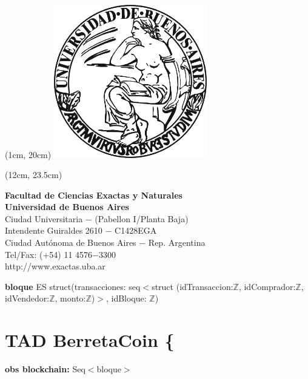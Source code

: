 \documentclass{article}
\newcommand{\Entero}{$\mathds{Z}$}
\begin{document}
\begin{textblock*}{17cm} (1cm, 20cm)
    {
    \includegraphics[width=0.5\textwidth]{uba_logo.jpg}
    }
\end{textblock*}

\begin{textblock*}{20cm} (12cm, 23.5cm)
    {\raggedright\textbf{Facultad de Ciencias Exactas y Naturales}\\
    \textbf{Universidad de Buenos Aires}\\
    Ciudad Universitaria $-$ (Pabellon I/Planta Baja)\\
    Intendente Guiraldes 2610 $-$ C1428EGA\\
    Ciudad Autónoma de Buenos Aires $-$ Rep. Argentina\\
    Tel/Fax: (+54) 11 4576$-$3300\\
    http://www.exactas.uba.ar
    }
\end{textblock*}



\newpage
\setcounter{page}{1}

\begin{flushleft}
    {\selectfont\textbf{bloque} ES} struct(transacciones: seq$<$struct (idTransaccion:\Entero, idComprador:\Entero, idVendedor:\Entero, monto:\Entero)$>$, idBloque: \Entero)
\end{flushleft}

\section*{{\selectfont TAD \textdollar BerretaCoin} \{}
    {\selectfont
        \textbf{obs blockchain:}} Seq$<$bloque$>$\\\\
\end{document}
